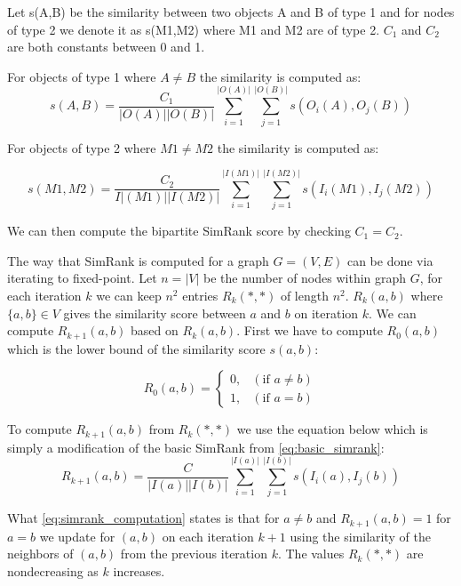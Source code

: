 \begin{definition}\label{def:bipartite_simrank} Let s(A,B) be the similarity between two objects A and B of type 1 and for nodes of type 2 we denote it as s(M1,M2) where M1 and M2 are of type 2. $C_1$ and $C_2$ are both constants between 0 and 1.

	For objects of type 1 where $A \neq B$ the similarity is computed as:
	\begin{equation}\label{eq:bipartite_simrank1}
	s(A,B)= \frac{C_1}{|O(A)||O(B)|}\sum^{|O(A)|}_{i=1}\sum^{|O(B)|}_{j=1}s(O_i(A),O_j(B))
	\end{equation}

	For objects of type 2 where $M1 \neq M2$ the similarity is computed as:

	\begin{equation}\label{eq:bipartite_simrank2}
	s(M1, M2)= \frac{C_2}{I|(M1)||I(M2)|}\sum^{|I(M1)|}_{i=1}\sum^{|I(M2)|}_{j=1}s(I_i(M1),I_j(M2))
	\end{equation}

	We can then compute the bipartite SimRank score by checking $C_1 = C_2$\cite{10.1145/775047.775126}.
\end{definition}

The way that SimRank is computed for a graph $G = (V,E)$ can be done via iterating to fixed-point.
Let $n = |V|$ be the number of nodes within graph $G$, for each iteration $k$ we can keep $n^2$ entries $R_k(*,*)$ of length $n^2$.
$R_k(a,b)$ where $\{a,b\} \in V$ gives the similarity score between $a$ and $b$ on iteration $k$\cite{10.1145/775047.775126}.
We can compute $R_{k+1}(a,b)$ based on $R_k(a,b)$.
First we have to compute $R_0(a,b)$ which is the lower bound of the similarity score $s(a,b)$:

\begin{equation}\label{eq:lowerbound_sim_score}
R_0(a,b)= \begin{cases}
0, & (\text{if } a \neq b) \\

1 ,& (\text{if } a = b)
\end{cases}
\end{equation}

To compute $R_{k+1}(a,b)$ from $R_k(*,*)$ we use the equation below which is simply a modification of the basic SimRank from \autoref{eq:basic_simrank}:
\begin{equation}\label{eq:simrank_computation}
R_{k+1}(a,b)= \frac{C}{|I(a)||I(b)|}\sum^{|I(a)|}_{i=1}\sum^{|I(b)|}_{j=1}s(I_i(a),I_j(b))
\end{equation}

What \autoref{eq:simrank_computation} states is that for $a \neq b$ and $R_{k+1}(a,b) = 1$ for $a = b$ we update for $(a,b)$ on each iteration $k+1$ using the similarity of the neighbors of $(a,b)$ from the previous iteration $k$. The values $R_k(*,*)$ are nondecreasing as $k$ increases.
